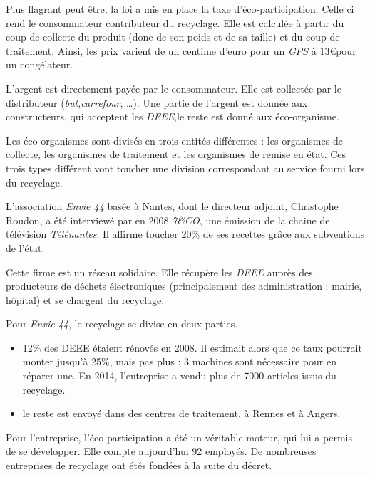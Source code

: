 Plus flagrant peut être, la loi a mis en place la taxe d'éco-participation. Celle ci rend le consommateur contributeur du recyclage. Elle est calculée à partir du coup de collecte du produit (donc de son poids et de sa taille) et du coup de traitement. Ainsi, les prix varient de un centime d'euro pour un \textit{GPS} à 13\euro pour un congélateur. 

L'argent est directement payée par le consommateur. Elle est collectée par le distributeur (\textit{but},\textit{carrefour}, \dots). Une partie de l'argent est donnée aux constructeurs, qui acceptent les \textit{DEEE},le reste est donné aux éco-organisme. 

Les éco-organismes sont divisés en trois entités différentes : les organismes de collecte, les organismes de traitement et les organismes de remise en état. Ces trois types différent vont toucher une division correspondant au service fourni lors du recyclage. 

\medbreak

L'association \textit{Envie 44} basée à Nantes, dont le directeur adjoint, Christophe Roudon, a été interviewé par en 2008 \textit{7\&CO}, une émission de la chaine de télévision \textit{Télénantes}. Il affirme toucher 20\% de ses recettes grâce aux subventions de l'état. 

Cette firme est un réseau solidaire. Elle récupère les \textit{DEEE} auprès des producteurs de déchets électroniques (principalement des administration : mairie, hôpital) et se chargent du recyclage. 

Pour \textit{Envie 44}, le recyclage se divise en deux parties. 
\begin{itemize}
\item 12\% des DEEE étaient rénovés en 2008. Il estimait alors que ce taux pourrait monter jusqu'à 25\%, mais pas plus : 3 machines sont nécessaire pour en réparer une. En 2014, l'entreprise a vendu plus de 7000 articles issus du recyclage. 
\item le reste est envoyé dans des centres de traitement, à Rennes et à Angers.
\end{itemize}

Pour l'entreprise, l'éco-participation a été un véritable moteur, qui lui a permis de se développer. Elle compte aujourd'hui 92 employés. De nombreuses entreprises de recyclage ont étés fondées à la suite du décret. 